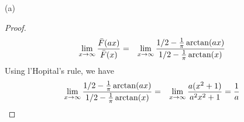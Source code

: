 \documentclass{report}
\begin{document}
\begin{enumerate}[1.]
\begin{enumerate}{(a)}
\begin{enumerate}[(i)]
      \begin{proof}
        \begin{eqnarray*}
          \lim_{x \to \infty} {\bar{F}(ax) \over \bar{F}(x)} &=&
          \lim_{x \to \infty}
          {
            1/2 - {1 \over \pi} \arctan(ax)
            \over
            1/2 - {1 \over \pi} \arctan(x)
          }
        \end{eqnarray*}
        Using l'Hopital's rule, we have
        \begin{eqnarray*}
          \lim_{x \to \infty}
          {
            1/2 - {1 \over \pi} \arctan(ax)
            \over
            1/2 - {1 \over \pi} \arctan(x)
          } &=&
          \lim_{x \to \infty} {
            a(x^2 + 1)
            \over
            a^2 x^2 + 1
          } = {1 \over a}
        \end{eqnarray*}
      \end{proof}


\end{enumerate}
\end{enumerate}
\end{enumerate}
\end{document}
